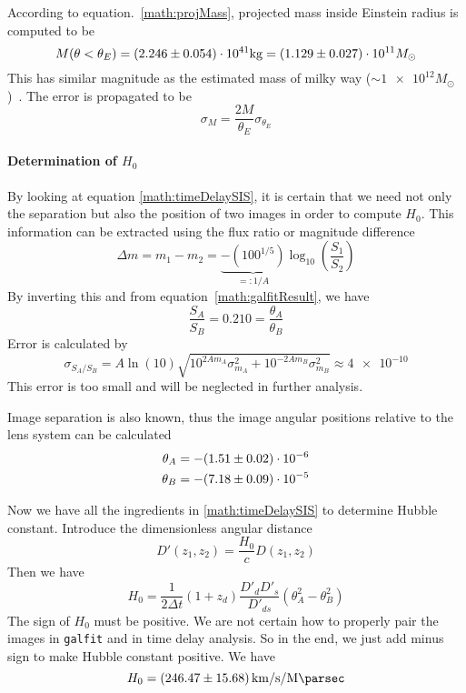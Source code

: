 According to equation.~\ref{math:projMass}, projected mass inside Einstein radius is computed to be
\begin{equation}
	M(\theta < \theta_E) = (\num{2.246 +- 0.054}) \cdot 10^{41} \si{\kg} = (\num{1.129 +- 0.027}) \cdot 10^{11} M_\odot
\end{equation}
This has similar magnitude as the estimated mass of milky way ($\sim \num{1e12} M_\odot$)~\cite{Grand_2019}. The error is propagated to be
\begin{equation*}
	\sigma_{M} = \frac{2M}{\theta_E} \sigma_{\theta_E}
\end{equation*}

\paragraph{Determination of $H_0$}
By looking at equation \eqref{math:timeDelaySIS}, it is certain that we need not only the separation but also the position of two images in order to compute $H_0$. This information can be extracted using the flux ratio or magnitude difference
\begin{equation}
	\Delta m = m_1 - m_2 = \underbrace{ - (100^{1/5})}_{=: 1/A} \log_{10} \left( \frac{S_1}{S_2} \right)
\end{equation}
By inverting this and from equation~\eqref{math:galfitResult}, we have
\begin{equation}
	\frac{S_A}{S_B} = \num{0.210}  = \frac{\theta_A}{\theta_B}
\end{equation}
Error is calculated by
\begin{equation*}
	\sigma_{S_A/S_B} = A \ln(10) \sqrt{ 10^{2Am_A} \sigma_{m_A}^2 + 10^{-2Am_B}\sigma_{m_B}^2} \approx \num{4e-10}
\end{equation*}
This error is too small and will be neglected in further analysis.

Image separation is also known, thus the image angular positions relative to the lens system can be calculated
\begin{align}
	\begin{split}	
	\theta_A &= -(\num{1.51 +- 0.02 })\cdot 10^{-6}\\
	\theta_B &= -(\num{7.18 +- 0.09})\cdot 10^{-5}
	\end{split}
\end{align}

Now we have all the ingredients in \eqref{math:timeDelaySIS} to determine Hubble constant. Introduce the dimensionless angular distance
\begin{equation*}
	D'(z_1, z_2 ) = \frac{H_0}{c} D(z_1, z_2)
\end{equation*}
Then we have
\begin{equation}
	H_0 =  \frac{1}{2 \Delta t} (1+z_d) \frac{D'_d D'_s}{D'_{ds}} (\theta_A^2 - \theta_B^2)
\end{equation}
The sign of $H_0$ must be positive. We are not certain how to properly pair the images in \verb|galfit| and in time delay analysis. So in the end, we just add minus sign to make Hubble constant positive. We have
\begin{equation}
	H_0 = \SI{246.47 +- 15.68}{\km\per\s\per\mega\parsec}
\end{equation}
